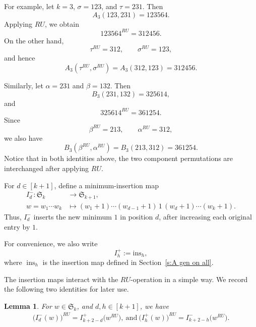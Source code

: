 \documentclass[12pt]{amsart}
\newtheorem{lem}[thm]{Lemma}
\theoremstyle{definition}
\numberwithin{equation}{section}
\newcommand{\ins}[1]{\mathrm{ins}_{#1}}
\begin{document}
For example, let $k=3$, $\sigma=123$, and $\tau=231$. Then
\begin{equation*}
A_3(123,231)=123564.
\end{equation*}
Applying $RU$, we obtain
\begin{equation*}
123564^{RU}=312456.
\end{equation*}
On the other hand,
\begin{equation*}
\tau^{RU}=312,
\qquad
\sigma^{RU}=123,
\end{equation*}
and hence
\begin{equation*}
A_3(\tau^{RU},\sigma^{RU})
=
A_3(312,123)
=
312456.
\end{equation*}

Similarly, let $\alpha=231$ and $\beta=132$. Then
\begin{equation*}
B_3(231,132)=325614,
\end{equation*}
and
\begin{equation*}
325614^{RU}=361254.
\end{equation*}
Since
\begin{equation*}
\beta^{RU}=213,
\qquad
\alpha^{RU}=312,
\end{equation*}
we also have
\begin{equation*}
B_3(\beta^{RU},\alpha^{RU})
=
B_3(213,312)
=
361254.
\end{equation*}
Notice that in both identities above, the two component permutations
are interchanged after applying $RU$.

For $d\in[k+1]$, define a minimum-insertion map
\begin{equation*}
\begin{aligned}
I_d^-:\mathfrak{S}_k &\to \mathfrak{S}_{k+1},\\
w=w_1\cdots w_k
&\mapsto
(w_1+1)\cdots(w_{d-1}+1)\,1\,
(w_d+1)\cdots(w_k+1).
\end{aligned}
\end{equation*}
Thus, $I_d^-$ inserts the new minimum $1$ in position $d$, after
increasing each original entry by $1$.

For convenience, we also write
\begin{equation*}
I_h^+ := \ins {h},
\end{equation*}
where $\operatorname{ins}_h$ is the insertion map defined in Section~\ref{s:A gen on all}.

The insertion maps interact with the $RU$-operation in a simple way.
We record the following two identities for later use.

\begin{lem}\label{l:ins RU identity}
For $w\in\mathfrak{S}_k$, and $d,h\in[k+1]$, we have
\begin{gather*}
\bigl(I_d^-(w)\bigr)^{RU}
=
I_{k+2-d}^+\bigl(w^{RU}\bigr),\ \text{and} \ \bigl(I_h^+(w)\bigr)^{RU}
=
I_{k+2-h}^-\bigl(w^{RU}\bigr).
\end{gather*}
\end{lem}
\end{document}

